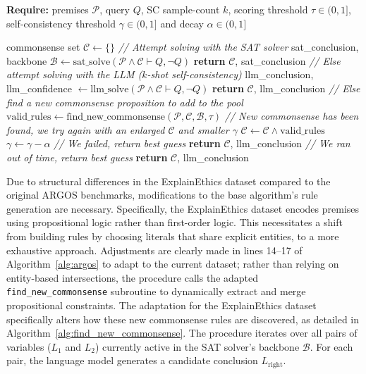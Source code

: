 \begin{algorithm}[H]
\caption{ARGOS}\label{alg:argos}
\textbf{Require:} premises $\mathcal{P}$, query $Q$, SC sample-count $k$, scoring threshold $\tau \in (0, 1]$, self-consistency threshold $\gamma \in (0, 1]$ and decay $\alpha \in (0, 1]$
\begin{algorithmic}[1]
\State commonsense set $\mathcal{C} \leftarrow \{\}$
    \State \textit{// Attempt solving with the SAT solver}
    \State sat\_conclusion, backbone $\mathcal{B} \leftarrow \text{sat\_solve}(\mathcal{P} \land \mathcal{C} \vdash Q, \neg Q)$
        \State \textbf{return} $\mathcal{C}$, sat\_conclusion
    \EndIf
    \State \textit{// Else attempt solving with the LLM ($k$-shot self-consistency)}
    \State llm\_conclusion, llm\_confidence $\leftarrow \text{llm\_solve}(\mathcal{P} \land \mathcal{C} \vdash Q, \neg Q)$
        \State \textbf{return} $\mathcal{C}$, llm\_conclusion
    \EndIf
    \State \textit{// Else find a new commonsense proposition to add to the pool}
    \State $\text{valid\_rules} \leftarrow \text{find\_new\_commonsense}(\mathcal{P}, \mathcal{C}, \mathcal{B}, \tau)$
        \State \textit{// New commonsense has been found, we try again with an enlarged $\mathcal{C}$ and smaller $\gamma$}
        \State $\mathcal{C} \leftarrow \mathcal{C} \land \text{valid\_rules}$
        \State $\gamma \leftarrow \gamma - \alpha$
    \Else
        \State \textit{// We failed, return best guess}
        \State \textbf{return} $\mathcal{C}$, llm\_conclusion
    \EndIf
\EndWhile
\State \textit{// We ran out of time, return best guess}
\State \textbf{return} $\mathcal{C}$, llm\_conclusion
\end{algorithmic}
\end{algorithm}

Due to structural differences in the ExplainEthics dataset compared to the original ARGOS benchmarks, modifications to the base algorithm's rule generation are necessary. Specifically, the ExplainEthics dataset encodes premises using propositional logic rather than first-order logic. This necessitates a shift from building rules by choosing literals that share explicit entities, to a more exhaustive approach. Adjustments are clearly made in lines 14--17 of Algorithm~\ref{alg:argos} to adapt to the current dataset; rather than relying on entity-based intersections, the procedure calls the adapted \texttt{find\_new\_commonsense} subroutine to dynamically extract and merge propositional constraints. The adaptation for the ExplainEthics dataset specifically alters how these new commonsense rules are discovered, as detailed in Algorithm~\ref{alg:find_new_commonsense}. The procedure iterates over all pairs of variables ($L_1$ and $L_2$) currently active in the SAT solver's backbone $\mathcal{B}$. For each pair, the language model generates a candidate conclusion $L_{\text{right}}$. 

